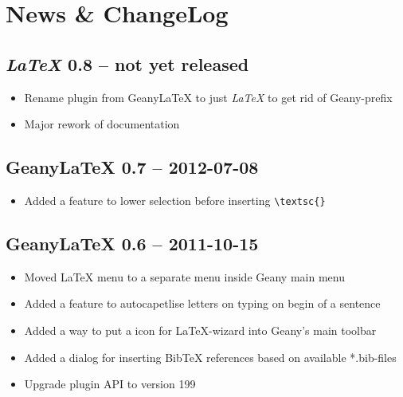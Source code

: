 \documentclass[%
paper=a4,%
fontsize=11pt,%
twoside=false,%
DIV18,%
headsepline,%
plainheadsepline,%
footsepline,%
plainfootsepline,%
bibliography=totoc,%
listof=totoc,%
BCOR10mm,%
parskip=half,%
openany,%
]{scrreprt}
\begin{document}
\newpage
\section{News \& ChangeLog}

\subsection{\textit{LaTeX} 0.8 -- not yet released}
\begin{itemize}
    \item Rename plugin from Geany\LaTeX{} to just \textit{LaTeX} to get rid of Geany-prefix
    \item Major rework of documentation
\end{itemize}

\subsection{Geany\LaTeX{} 0.7 -- 2012-07-08}
\begin{itemize}
    \item Added a feature to lower selection before inserting
        \texttt{\textbackslash{}textsc\{\}}
\end{itemize}

\subsection{Geany\LaTeX{} 0.6 -- 2011-10-15}
\begin{itemize}
    \item Moved \LaTeX{} menu to a separate menu inside Geany main menu
    \item Added a feature to autocapetlise letters on typing on begin of
          a sentence
    \item Added a way to put a icon for \LaTeX{}-wizard into Geany's main
          toolbar
    \item Added a dialog for inserting BibTeX references based on
          available *.bib-files
    \item Upgrade plugin API to version 199
\end{itemize}
\end{document}
